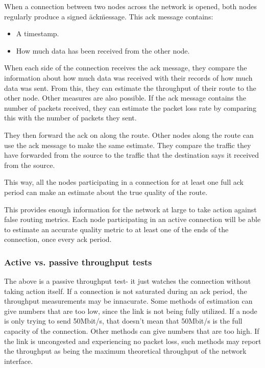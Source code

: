 \documentclass[11pt]{article}
\begin{document}
When a connection between two nodes across the network is opened, both nodes regularly produce a signed \"ack\" message. This ack message contains:

\begin{itemize}
	\item A timestamp.
	\item How much data has been received from the other node.
\end{itemize}

When each side of the connection receives the ack message, they compare the information about how much data was received with their records of how much data was sent. From this, they can estimate the throughput of their route to the other node. Other measures are also possible. If the ack message contains the number of packets received, they can estimate the packet loss rate by comparing this with the number of packets they sent.

They then forward the ack on along the route. Other nodes along the route can use the ack message to make the same estimate. They compare the traffic they have forwarded from the source to the traffic that the destination says it received from the source.

This way, all the nodes participating in a connection for at least one full ack period can make an estimate about the true quality of the route.

This provides enough information for the network at large to take action against false routing metrics. Each node participating in an active connection will be able to estimate an accurate quality metric to at least one of the ends of the connection, once every ack period.

\subsubsection{Active vs. passive throughput tests}
The above is a passive throughput test- it just watches the connection without taking action itself. If a connection is not saturated during an ack period, the throughput measurements may be innacurate. Some methods of estimation can give numbers that are too low, since the link is not being fully utilized. If a node is only trying to send 50Mbit/s, that doesn't mean that 50Mbit/s is the full capacity of the connection. Other methods can give numbers that are too high. If the link is uncongested and experiencing no packet loss, such methods may report the throughput as being the maximum theoretical throughput of the network interface.
\end{document}
